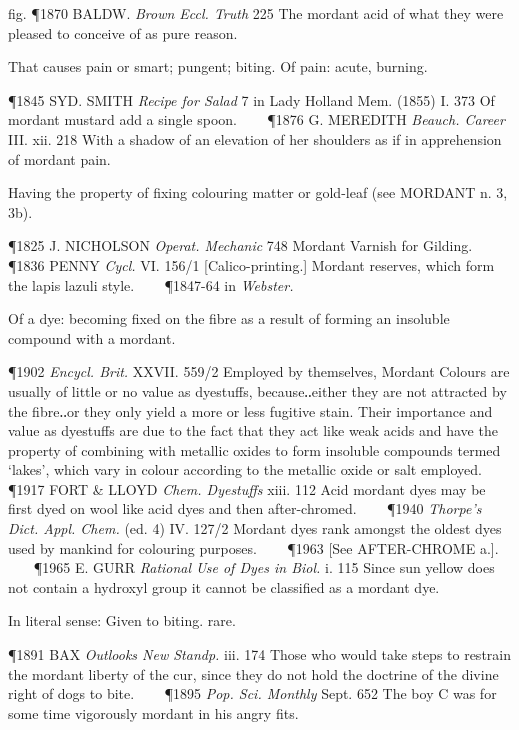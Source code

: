 \begin{description}[wide, labelwidth=!, labelindent=0pt]
\begin{myenumerate}
fig. \P 1870 BALDW.  \textit{Brown Eccl. Truth} 225 The mordant acid of what they were pleased to conceive of as pure reason.

 That causes pain or smart; pungent; biting. Of pain: acute, burning.

\P 1845 SYD. SMITH  \textit{Recipe for Salad} 7 in Lady Holland Mem. (1855) I. 373 Of mordant mustard add a single spoon.    
\P 1876 G. MEREDITH  \textit{Beauch. Career} III. xii. 218 With a shadow of an elevation of her shoulders as if in apprehension of mordant pain.

 Having the property of fixing colouring matter or gold-leaf (see MORDANT n. 3, 3b).

\P 1825 J. NICHOLSON  \textit{Operat. Mechanic} 748 Mordant Varnish for Gilding.    
\P 1836 PENNY  \textit{Cycl.} VI. 156/1 [Calico-printing.] Mordant reserves, which form the lapis lazuli style.    
\P 1847-64 in  \textit{Webster.}

 Of a dye: becoming fixed on the fibre as a result of forming an insoluble compound with a mordant.

\P 1902  \textit{Encycl. Brit.} XXVII. 559/2 Employed by themselves, Mordant Colours are usually of little or no value as dyestuffs, because‥either they are not attracted by the fibre‥or they only yield a more or less fugitive stain. Their importance and value as dyestuffs are due to the fact that they act like weak acids and have the property of combining with metallic oxides to form insoluble compounds termed ‘lakes’, which vary in colour according to the metallic oxide or salt employed.    
\P 1917 FORT \& LLOYD  \textit{Chem. Dyestuffs} xiii. 112 Acid mordant dyes may be first dyed on wool like acid dyes and then after-chromed.    
\P 1940 \textit{Thorpe's  Dict. Appl. Chem.} (ed. 4) IV. 127/2 Mordant dyes rank amongst the oldest dyes used by mankind for colouring purposes.    
\P 1963 [See  AFTER-CHROME a.].    
\P 1965 E. GURR  \textit{Rational Use of Dyes in Biol.} i. 115 Since sun yellow does not contain a hydroxyl group it cannot be classified as a mordant dye.

 In literal sense: Given to biting. rare.

\P 1891 BAX  \textit{Outlooks New Standp.} iii. 174 Those who would take steps to restrain the mordant liberty of the cur, since they do not hold the doctrine of the divine right of dogs to bite.    
\P 1895 \textit{Pop.  Sci. Monthly} Sept. 652 The boy C  was for some time vigorously mordant in his angry fits.




\end{myenumerate}
\end{description}
